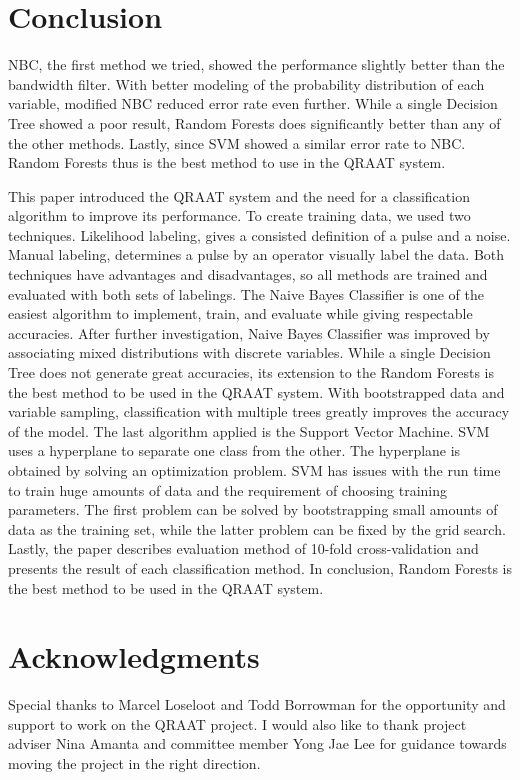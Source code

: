 \documentclass[twoside]{article}
\begin{document}

\section{Conclusion}
NBC, the first method we tried, showed the performance slightly better than the bandwidth filter. With better modeling of the probability distribution of each variable, modified NBC reduced error rate even further. While a single Decision Tree showed a poor result, Random Forests does significantly better than any of the other methods. Lastly, since SVM showed a similar error rate to NBC. Random Forests thus is the best method to use in the QRAAT system. 

This paper introduced the QRAAT system and the need for a classification algorithm to improve its performance. To create training data, we used two techniques. Likelihood labeling, gives a consisted definition of a pulse and a noise. Manual labeling, determines a pulse by an operator visually label the data. Both techniques have advantages and disadvantages, so all methods are trained and evaluated with both sets of labelings. The Naive Bayes Classifier is one of the easiest algorithm to implement, train, and evaluate while giving respectable accuracies. After further investigation, Naive Bayes Classifier was improved by associating mixed distributions with discrete variables. While a single Decision Tree does not generate great accuracies, its extension to the Random Forests is the best method to be used in the QRAAT system. With bootstrapped data and variable sampling, classification with multiple trees greatly improves the accuracy of the model. The last algorithm applied is the Support Vector Machine. SVM uses a hyperplane to separate one class from the other. The hyperplane is obtained by solving an optimization problem. SVM has issues with the run time to train huge amounts of data and the requirement of choosing training parameters. The first problem can be solved by bootstrapping small amounts of data as the training set, while the latter problem can be fixed by the grid search. Lastly, the paper describes evaluation method of 10-fold cross-validation and presents the result of each classification method. In conclusion, Random Forests is the best method to be used in the QRAAT system.


\section{Acknowledgments}
Special thanks to Marcel Loseloot and Todd Borrowman for the opportunity and support to work on the QRAAT project. I would also like to thank project adviser Nina Amanta and committee member Yong Jae Lee for guidance towards moving the project in the right direction. 
\end{document}
